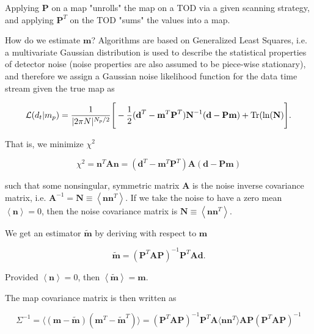 \documentclass[12pt]{article}
\begin{document}
Applying $\textbf{P}$ on a map "unrolls" the map on a TOD via a given scanning strategy, and applying $\textbf{P}^{T}$ on the TOD "sums" the values into a map. 

How do we estimate $\textbf{m}$? Algorithms are based on Generalized Least Squares, i.e. a multivariate Gaussian distribution is used to describe the statistical properties of detector noise (noise properties are also assumed to be piece-wise stationary), and therefore we assign a Gaussian noise likelihood function for the data time stream given the true map as

\begin{equation}
\mathcal{L}(d_t | m_p) = \frac{1}{|2\pi N|^{N_p/2}} \Bigg[-\frac{1}{2}(\textbf{d}^{T} - \textbf{m}^{T}\textbf{P}^{T})\textbf{N}^{-1}(\textbf{d} - \textbf{P}\textbf{m}) + \textnormal{Tr}(\textnormal{ln}(\textbf{N})\Bigg].
\end{equation}


That is, we minimize $\chi^2$ 

\begin{equation}
\chi^2 = \textbf{n}^{T}\textbf{A}\textbf{n} = (\textbf{d}^{T} - \textbf{m}^{T}\textbf{P}^{T})\textbf{A}(\textbf{d} - \textbf{P}\textbf{m})
\end{equation}

such that some nonsingular, symmetric matrix $\textbf{A}$ is the noise inverse covariance matrix, i.e. $\textbf{A}^{-1} = \textbf{N} \equiv\left<\textbf{n}\textbf{n}^T\right>$. If we take the noise to have a zero mean $\left<\textbf{n}\right>=0$, then the noise covariance matrix is $\textbf{N} \equiv\left<\textbf{n}\textbf{n}^T\right>$. 

We get an estimator $\widetilde{\textbf{m}}$ by deriving with respect to $\textbf{m}$

\begin{equation}
\widetilde{\textbf{m}} = (\textbf{P}^{T}\textbf{A}\textbf{P})^{-1}\textbf{P}^{T}\textbf{A}\textbf{d}.
\end{equation}

Provided $\left<\textbf{n}\right>=0$, then $\left<\widetilde{\textbf{m}}\right>=\textbf{m}$.

The map covariance matrix is then written as

\begin{equation}
\Sigma^{-1}= \langle(\textbf{m}-\widetilde{\textbf{m}})(\textbf{m}^{T}-\widetilde{\textbf{m}}^{T})\rangle=(\textbf{P}^{T}\textbf{AP})^{-1}\textbf{P}^{T}\textbf{A}\langle\textbf{nn}^{T}\rangle\textbf{AP}(\textbf{P}^{T}\textbf{AP})^{-1}
\end{equation}
\end{document}
